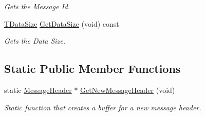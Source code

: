 \begin{DoxyCompactItemize}
\begin{DoxyCompactList}\small\item\em Gets the Message Id. \end{DoxyCompactList}\item 
\hyperlink{namespace_terra_swarm_a092e6ec9739175076ae3106783f5c1b6}{T\-Data\-Size} \hyperlink{class_terra_swarm_1_1_message_header_a77ce27ba8283537c9cbf3c447abbc512}{Get\-Data\-Size} (void) const 
\begin{DoxyCompactList}\small\item\em Gets the Data Size. \end{DoxyCompactList}\end{DoxyCompactItemize}
\subsection*{Static Public Member Functions}
\begin{DoxyCompactItemize}
\item 
static \hyperlink{class_terra_swarm_1_1_message_header}{Message\-Header} $\ast$ \hyperlink{class_terra_swarm_1_1_message_header_adfe790bb186f34e505d4ca699f7aa06b}{Get\-New\-Message\-Header} (void)
\begin{DoxyCompactList}\small\item\em Static function that creates a buffer for a new message header. \end{DoxyCompactList}\end{DoxyCompactItemize}
